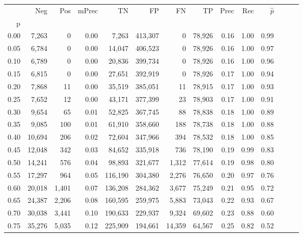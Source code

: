 \begin{tabular}{rrrrrrrrrrrrrr}
\toprule
{} &     Neg &     Pos & mPrec &       TN &       FP &      FN &      TP &  Prec &   Rec & $\hat{p}$ \\
p    &         &         &       &          &          &         &         &       &       &           \\
\midrule
0.00 &   7,263 &       0 &  0.00 &    7,263 &  413,307 &       0 &  78,926 &  0.16 &  1.00 &      0.99 \\
0.05 &   6,784 &       0 &  0.00 &   14,047 &  406,523 &       0 &  78,926 &  0.16 &  1.00 &      0.97 \\
0.10 &   6,789 &       0 &  0.00 &   20,836 &  399,734 &       0 &  78,926 &  0.16 &  1.00 &      0.96 \\
0.15 &   6,815 &       0 &  0.00 &   27,651 &  392,919 &       0 &  78,926 &  0.17 &  1.00 &      0.94 \\
0.20 &   7,868 &      11 &  0.00 &   35,519 &  385,051 &      11 &  78,915 &  0.17 &  1.00 &      0.93 \\
0.25 &   7,652 &      12 &  0.00 &   43,171 &  377,399 &      23 &  78,903 &  0.17 &  1.00 &      0.91 \\
0.30 &   9,654 &      65 &  0.01 &   52,825 &  367,745 &      88 &  78,838 &  0.18 &  1.00 &      0.89 \\
0.35 &   9,085 &     100 &  0.01 &   61,910 &  358,660 &     188 &  78,738 &  0.18 &  1.00 &      0.88 \\
0.40 &  10,694 &     206 &  0.02 &   72,604 &  347,966 &     394 &  78,532 &  0.18 &  1.00 &      0.85 \\
0.45 &  12,048 &     342 &  0.03 &   84,652 &  335,918 &     736 &  78,190 &  0.19 &  0.99 &      0.83 \\
0.50 &  14,241 &     576 &  0.04 &   98,893 &  321,677 &   1,312 &  77,614 &  0.19 &  0.98 &      0.80 \\
0.55 &  17,297 &     964 &  0.05 &  116,190 &  304,380 &   2,276 &  76,650 &  0.20 &  0.97 &      0.76 \\
0.60 &  20,018 &   1,401 &  0.07 &  136,208 &  284,362 &   3,677 &  75,249 &  0.21 &  0.95 &      0.72 \\
0.65 &  24,387 &   2,206 &  0.08 &  160,595 &  259,975 &   5,883 &  73,043 &  0.22 &  0.93 &      0.67 \\
0.70 &  30,038 &   3,441 &  0.10 &  190,633 &  229,937 &   9,324 &  69,602 &  0.23 &  0.88 &      0.60 \\
0.75 &  35,276 &   5,035 &  0.12 &  225,909 &  194,661 &  14,359 &  64,567 &  0.25 &  0.82 &      0.52 \\

\end{tabular}

